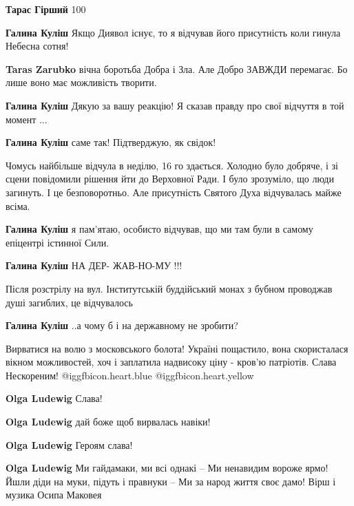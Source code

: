 \begin{itemize}
\begin{itemize}
\textbf{Тарас Гірший} 100%

\textbf{Галина Куліш} Якщо Диявол існує, то я відчував його присутність коли гинула Небесна сотня!

\textbf{Taras Zarubko} вічна боротьба Добра і Зла. Але Добро ЗАВЖДИ перемагає. Бо лише воно має можливість творити.

\textbf{Галина Куліш} Дякую за вашу реакцію! Я сказав правду про свої відчуття в той момент ...

\textbf{Галина Куліш} саме так! Підтверджую, як свідок!

\begin{itemize} %
Чомусь найбільше відчула в неділю, 16 го здається. Холодно було добряче, і зі сцени повідомили рішення йти до Верховної Ради. І було зрозуміло, що люди загинуть. І це безповоротньо. Але присутність Святого Духа відчувалась майже всіма.
\end{itemize} %

\textbf{Галина Куліш} я пам’ятаю, особисто відчував, що ми там були в самому епіцентрі істинної Сили.

\textbf{Галина Куліш} НА ДЕР- ЖАВ-НО-МУ !!!

Після розстрілу на вул. Інститутській буддійський монах з бубном проводжав душі
загиблих, це відчувалось

\textbf{Галина Куліш} ..а чому б і на державному не зробити?

\end{itemize} %


Вирватися на волю з московського болота! Україні пощастило, вона скористалася
вікном можливостей, хоч і заплатила надвисоку ціну - кров'ю патріотів. Слава
Нескореним! @igg{fbicon.heart.blue}  @igg{fbicon.heart.yellow} 

\begin{itemize} %
\textbf{Olga Ludewig} Слава!

\textbf{Olga Ludewig} дай боже щоб вирвалась навіки!

\textbf{Olga Ludewig} Героям слава!

\textbf{Olga Ludewig} Ми гайдамаки, ми всі однакі –
Ми ненавидим вороже ярмо!
Йшли діди на муки, підуть і правнуки –
Ми за народ життя своє дамо! Вірш і музика Осипа Маковея 


\end{itemize}
\end{itemize}

